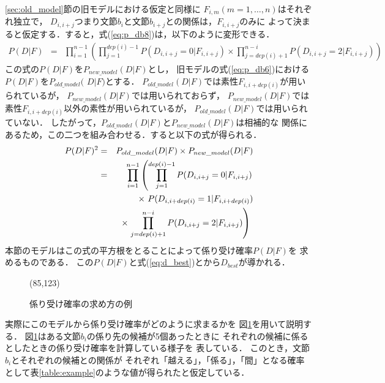 \ref{sec:old_model}節の旧モデルにおける仮定と同様に
$F_{i,m} (m=1,\ldots,n)$はそれぞれ独立で，
$D_{i,i+j}$つまり文節$b_{i}$と文節$b_{i+j}$との関係は，$F_{i,i+j}$のみに
よって決まると仮定する．すると，式(\ref{eq:p_db8})は，以下のように変形できる．
\begin{eqnarray}
  \label{eq:p_db9}
  P(D|F) & = & 
  \prod_{i=1}^{n-1}
  \left(\prod_{j=1}^{dep(i)-1}P(D_{i,i+j}=0|F_{i,i+j})
    \times \prod_{j=dep(i)+1}^{n-i}P(D_{i,i+j}=2|F_{i,i+j})\right)
\end{eqnarray}
この式の$P(D|F)$を$P_{new\_model}(D|F)$とし，
旧モデルの式(\ref{eq:p_db6})における$P(D|F)$を$P_{old\_model}($ $D|F)$とする．
$P_{old\_model}(D|F)$では素性$F_{i,i+dep(i)}$が用いられているが，
$P_{new\_model}(D|F)$では用いられておらず，
$P_{new\_model}(D|F)$では素性$F_{i,i+dep(i)}$以外の素性が用いられているが，
$P_{old\_model}(D|F)$では用いられていない．
したがって，$P_{old\_model}(D|F)$と$P_{new\_model}(D|F)$は相補的な
関係にあるため，この二つを組み合わせる．すると以下の式が得られる．
\begin{eqnarray}
  \label{eq:p_db10}
  P(D|F)^{2} & = & P_{old\_model}(D|F)\times P_{new\_model}(D|F)\nonumber\\
  & = & 
  \prod_{i=1}^{n-1}
  \left(\prod_{j=1}^{dep(i)-1}P(D_{i,i+j}=0|F_{i,i+j})\right.\nonumber\\
  & &  \times\ P(D_{i,i+dep(i)}=1|F_{i,i+dep(i)})\nonumber\\
  & &  
  \times \left.\prod_{j=dep(i)+1}^{n-i}P(D_{i,i+j}=2|F_{i,i+j})\right)\
\end{eqnarray}
本節のモデルはこの式の平方根をとることによって係り受け確率$P(D|F)$を
求めるものである．
この$P(D|F)$と式(\ref{eq:d_best})とから$D_{best}$が導かれる．

\begin{figure}[htbp]
  \begin{center}
    \leavevmode
\atari(85,123)
    \caption{係り受け確率の求め方の例}
    \label{fig:dependency}
  \end{center}
\end{figure}

実際にこのモデルから係り受け確率がどのように求まるかを
図\ref{fig:dependency}を用いて説明する．
図\ref{fig:dependency}はある文節$b_{i}$の係り先の候補が5個あったときに
それぞれの候補に係るとしたときの係り受け確率を計算している様子を
表している．
このとき，文節$b_{i}$とそれぞれの候補との関係が
それぞれ「越える」，「係る」，「間」となる確率
として表\ref{table:example}のような値が得られたと仮定している．

